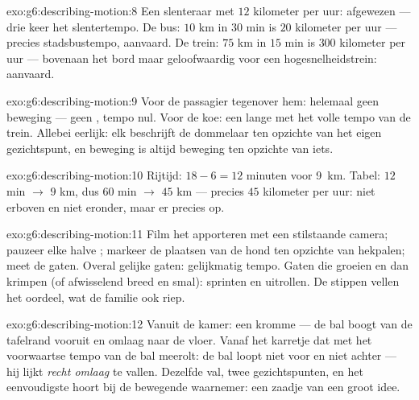 \begin{solution}{exo:g6:describing-motion:8}
Een slenteraar met $12$ kilometer per uur: afgewezen --- drie keer het
slentertempo. De bus: $10$ km in $30$ min is $20$ kilometer per uur
--- precies stadsbustempo, aanvaard. De trein: $75$ km in $15$ min is
$300$ kilometer per uur --- bovenaan het bord maar geloofwaardig voor
een hogesnelheidstrein: aanvaard.
\end{solution}

\begin{solution}{exo:g6:describing-motion:9}
Voor de passagier tegenover hem: helemaal geen beweging --- geen
, tempo nul. Voor de koe: een lange
 met het volle tempo van de trein. Allebei
eerlijk: elk beschrijft de dommelaar ten opzichte van het eigen
gezichtspunt, en beweging is altijd beweging ten opzichte van iets.
\end{solution}

\begin{solution}{exo:g6:describing-motion:10}
Rijtijd: $18 - 6 = 12$ minuten voor \qty{9}{km}. Tabel: $12$ min
$\to$ $9$ km, dus $60$ min $\to$ $45$ km --- precies $45$ kilometer
per uur: niet erboven en niet eronder, maar er precies op.
\end{solution}

\begin{solution}{exo:g6:describing-motion:11}
Film het apporteren met een stilstaande camera; pauzeer elke halve
; markeer de plaatsen van de hond ten opzichte van hekpalen;
meet de gaten. Overal gelijke gaten: gelijkmatig tempo. Gaten die
groeien en dan krimpen (of afwisselend breed en smal): sprinten en
uitrollen. De stippen vellen het oordeel, wat de familie ook riep.
\end{solution}

\begin{solution}{exo:g6:describing-motion:12}
Vanuit de kamer: een kromme --- de bal boogt van de tafelrand vooruit
en omlaag naar de vloer. Vanaf het karretje dat met het voorwaartse
tempo van de bal meerolt: de bal loopt niet voor en niet achter ---
hij lijkt \emph{recht omlaag} te vallen. Dezelfde val, twee
gezichtspunten, en het eenvoudigste  hoort bij de bewegende
waarnemer: een zaadje van een groot idee.
\end{solution}

